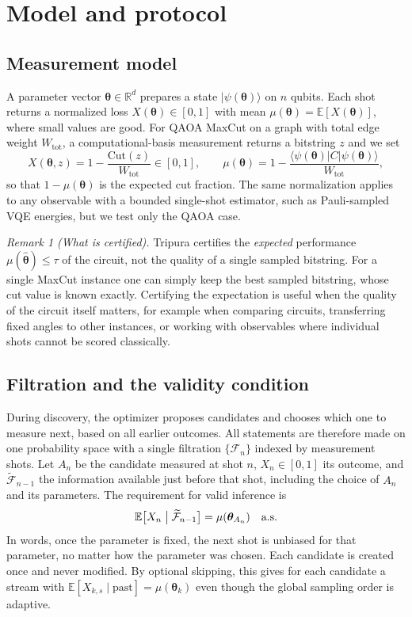 \documentclass[a4paper,onecolumn,unpublished]{quantumarticle}
\newcommand{\E}{\mathbb{E}}
\newcommand{\F}{\mathcal{F}}
\newcommand{\R}{\mathbb{R}}
\providecommand{\ket}[1]{\lvert #1 \rangle}
\providecommand{\mel}[3]{\langle #1 \vert #2 \vert #3 \rangle}
\renewcommand{\th}{\bm{\theta}}
\newcommand{\thhat}{\widehat{\bm{\theta}}}
\begin{document}
\section{Model and protocol}
\label{sec:model}

\subsection{Measurement model}
\label{subsec:measurement}

A parameter vector $\th \in \R^d$ prepares a state $\ket{\psi(\th)}$ on $n$ qubits. Each shot returns a normalized loss $X(\th) \in [0, 1]$ with mean $\mu(\th) = \E[X(\th)]$, where small values are good. For QAOA MaxCut on a graph with total edge weight $W_{\mathrm{tot}}$, a computational-basis measurement returns a bitstring $z$ and we set
\begin{equation}
  X(\th, z) = 1 - \frac{\mathrm{Cut}(z)}{W_{\mathrm{tot}}} \in [0, 1],
  \qquad
  \mu(\th) = 1 - \frac{\mel{\psi(\th)}{C}{\psi(\th)}}{W_{\mathrm{tot}}},
  \label{eq:qaoa_estimator}
\end{equation}
so that $1 - \mu(\th)$ is the expected cut fraction. The same normalization applies to any observable with a bounded single-shot estimator, such as Pauli-sampled VQE energies, but we test only the QAOA case.

\medskip\noindent\emph{Remark 1 (What is certified).}\label{rem:what_is_certified}
Tripura certifies the \emph{expected} performance $\mu(\thhat) \le \tau$ of the circuit, not the quality of a single sampled bitstring. For a single MaxCut instance one can simply keep the best sampled bitstring, whose cut value is known exactly. Certifying the expectation is useful when the quality of the circuit itself matters, for example when comparing circuits, transferring fixed angles to other instances, or working with observables where individual shots cannot be scored classically.

\subsection{Filtration and the validity condition}
\label{subsec:filtration}

During discovery, the optimizer proposes candidates and chooses which one to measure next, based on all earlier outcomes. All statements are therefore made on one probability space with a single filtration $\{\F_n\}$ indexed by measurement shots. Let $A_n$ be the candidate measured at shot $n$, $X_n \in [0, 1]$ its outcome, and $\widetilde{\F}_{n-1}$ the information available just before that shot, including the choice of $A_n$ and its parameters. The requirement for valid inference is
\begin{equation}
  \E\bigl[X_n \bigm| \widetilde{\F}_{n-1}\bigr] = \mu(\th_{A_n}) \quad \text{a.s.}
  \label{eq:validity_condition}
\end{equation}
In words, once the parameter is fixed, the next shot is unbiased for that parameter, no matter how the parameter was chosen. Each candidate is created once and never modified. By optional skipping, this gives for each candidate a stream with $\E[X_{k,s} \mid \text{past}] = \mu(\th_k)$ even though the global sampling order is adaptive.
\end{document}
